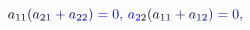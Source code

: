 \documentclass[12pt]{article}
\begin{document}
\makeatletter
\renewcommand*{\@textcolor}[3]{%
  \protect\leavevmode
  \begingroup
    \color#1{#2}#3%
  \endgroup
}
\makeatother
\begin{displaymath}
\mathcolor[RGB]{0,0,15}{a} _ { \mathcolor[RGB]{0,0,30}{1} \mathcolor[RGB]{0,0,45}{1} } \mathcolor[RGB]{0,0,60}{(} \mathcolor[RGB]{0,0,75}{a} _ { \mathcolor[RGB]{0,0,90}{2} \mathcolor[RGB]{0,0,105}{1} } \mathcolor[RGB]{0,0,120}{+} \mathcolor[RGB]{0,0,135}{a} _ { \mathcolor[RGB]{0,0,150}{2} \mathcolor[RGB]{0,0,165}{2} } \mathcolor[RGB]{0,0,180}{)} \mathcolor[RGB]{0,0,195}{=} \mathcolor[RGB]{0,0,210}{0} \mathcolor[RGB]{0,0,225}{,} \mathcolor[RGB]{0,0,240}{\,
a} _ { \mathcolor[RGB]{0,0,255}{2} \mathcolor[RGB]{0,15,0}{2} } \mathcolor[RGB]{0,15,15}{(} \mathcolor[RGB]{0,15,30}{a} _ { \mathcolor[RGB]{0,15,45}{1} \mathcolor[RGB]{0,15,60}{1} } \mathcolor[RGB]{0,15,75}{+} \mathcolor[RGB]{0,15,90}{a} _ { \mathcolor[RGB]{0,15,105}{1} \mathcolor[RGB]{0,15,120}{2} } \mathcolor[RGB]{0,15,135}{)} \mathcolor[RGB]{0,15,150}{=} \mathcolor[RGB]{0,15,165}{0} \mathcolor[RGB]{0,15,180}{,} \,
\end{displaymath}
\end{document}
